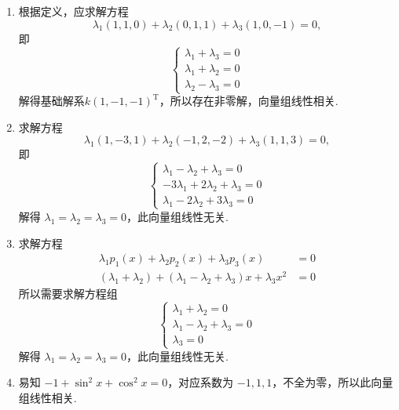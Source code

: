 \documentclass[UTF8,12pt,a4paper,fontset=fandol]{ctexart}
\begin{document}
\begin{solve}
\begin{enumerate}
        \item 根据定义，应求解方程
              \[\lambda_1(1,1,0) + \lambda_2(0,1,1) + \lambda_3(1,0,-1) = 0,\]
              即
              \[ \begin{cases}
                      \lambda_1 + \lambda_3 = 0 \\
                      \lambda_1 + \lambda_2 = 0 \\
                      \lambda_2 - \lambda_3 = 0
                  \end{cases} \]
              解得基础解系$k(1,-1,-1)^\mathrm{T}$，所以存在非零解，向量组线性相关.

        \item 求解方程
              \[\lambda_1(1,-3,1) + \lambda_2(-1,2,-2) + \lambda_3(1,1,3) = 0,\]
              即
              \[ \begin{cases}
                      \lambda_1 - \lambda_2 + \lambda_3 = 0    \\
                      -3\lambda_1 + 2\lambda_2 + \lambda_3 = 0 \\
                      \lambda_1 - 2\lambda_2 + 3\lambda_3 = 0
                  \end{cases} \]
              解得 $\lambda_1 = \lambda_2 = \lambda_3 = 0$，此向量组线性无关.

        \item 求解方程
              \begin{align*}
                  \lambda_1p_1(x) + \lambda_2p_2(x) + \lambda_3p_3(x)                           & = 0 \\
                  (\lambda_1 + \lambda_2) + (\lambda_1 - \lambda_2 + \lambda_3)x + \lambda_3x^2 & = 0
              \end{align*}
              所以需要求解方程组
              \[ \begin{cases}
                      \lambda_1 + \lambda_2 = 0             \\
                      \lambda_1 - \lambda_2 + \lambda_3 = 0 \\
                      \lambda_3 = 0
                  \end{cases} \]
              解得 $\lambda_1 = \lambda_2 = \lambda_3 = 0$，此向量组线性无关.

        \item 易知 $-1 + \sin^2x + \cos^2x = 0$，对应系数为 $-1, 1, 1$，不全为零，所以此向量组线性相关.


\end{enumerate}
\end{solve}
\end{document}
